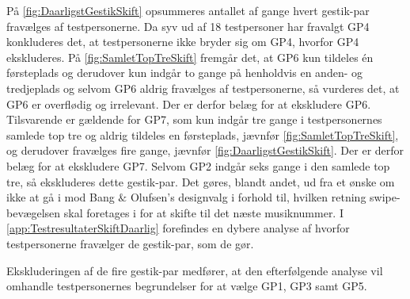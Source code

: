 På \autoref{fig:DaarligstGestikSkift} opsummeres antallet af gange hvert gestik-par fravælges af testpersonerne. Da syv ud af 18 testpersoner har fravalgt GP4 konkluderes det, at testpersonerne ikke bryder sig om GP4, hvorfor GP4 ekskluderes. På \autoref{fig:SamletTopTreSkift} fremgår det, at GP6 kun tildeles én førsteplads og derudover kun indgår to gange på henholdvis en anden- og tredjeplads og selvom GP6 aldrig fravælges af testpersonerne, så vurderes det, at GP6 er overflødig og irrelevant. Der er derfor belæg for at ekskludere GP6. Tilsvarende er gældende for GP7, som kun indgår tre gange i testpersonernes samlede top tre og aldrig tildeles en førsteplads, jævnfør \autoref{fig:SamletTopTreSkift}, og derudover fravælges fire gange, jævnfør \autoref{fig:DaarligstGestikSkift}. Der er derfor belæg for at ekskludere GP7. Selvom GP2 indgår seks gange i den samlede top tre, så ekskluderes dette gestik-par. Det gøres, blandt andet, ud fra et ønske om ikke at gå i mod Bang $\&$ Olufsen's designvalg i forhold til, hvilken retning swipe-bevægelsen skal foretages i for at skifte til det næste musiknummer. I \autoref{app:TestresultaterSkiftDaarlig} forefindes en dybere analyse af hvorfor testpersonerne fravælger de gestik-par, som de gør. 

Ekskluderingen af de fire gestik-par medfører, at den efterfølgende analyse vil omhandle testpersonernes begrundelser for at vælge GP1, GP3 samt GP5.
%
